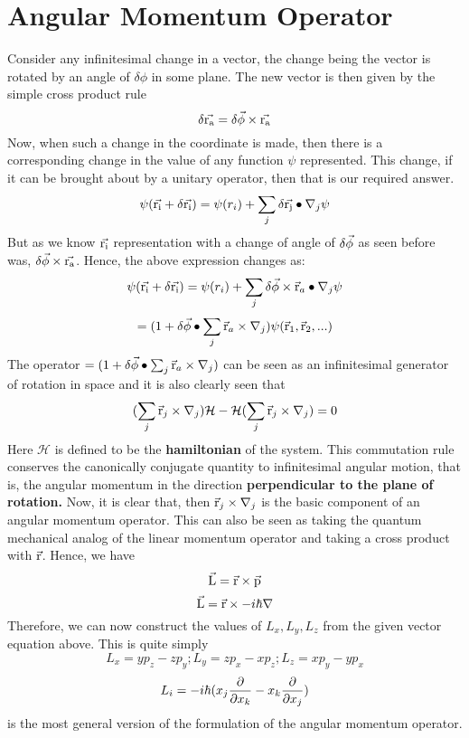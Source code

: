 \documentclass[12pt]{article}
\begin{document}
\section{Angular Momentum Operator}
Consider any infinitesimal change in a vector, the change being the vector is rotated by an angle of $\delta\phi$ in some plane. The new vector is then given by the simple cross product rule $$\delta\vec{\mathrm{r_{a}}} = {\delta\vec{\mathrm{\phi}}}\times{\ensuremath{\vec{\mathrm{r_{a}}}}}$$ Now, when such a change in the coordinate is made, then there is a corresponding change in the value of any function $\psi$ represented. This change, if it can be brought about by a unitary operator, then that is our required answer. $$\psi (\vec{\mathrm{r_{i}}}+\delta\vec{\mathrm{r_{i}}}) = \psi(r_{i}) + \sum_j \delta{\ensuremath{\vec{\mathrm{r_{j}}}}}\bullet{\ensuremath{\nabla}_{j}\psi}$$
But as we know $\vec{\mathrm{r_{i}}}$ representation with a change of angle of $\delta\vec{\mathrm{\phi}}$ as seen before was, ${\delta\vec{\mathrm{\phi}}}\times{\ensuremath{\vec{\mathrm{r_{a}}}}}$. Hence, the above expression changes as:	
$$\psi (\vec{\mathrm{r_{i}}}+\delta\vec{\mathrm{r_{i}}}) = \psi(r_{i}) + \sum_j {\delta\vec{\mathrm{\phi}}}\times{\ensuremath{{\vec{\mathrm{r}}_{a}}\bullet{\ensuremath{\nabla}_{j}\psi}}}$$
$$=(1+{\delta\vec{\mathrm{\phi}}}\bullet{\sum_j \ensuremath{{\vec{\mathrm{r}}_{a}}\times{\ensuremath{\nabla}_{j}}}})\psi(\vec{\mathrm{r}}_1,\vec{\mathrm{r}}_2,...)$$ The operator $=(1+{\delta\vec{\mathrm{\phi}}}\bullet{\sum_j \ensuremath{{\vec{\mathrm{r}}_{a}}\times{\ensuremath{\nabla}_{j}}}})$ can be seen as an infinitesimal generator of rotation in space and it is also clearly seen that $$(\sum_j{\vec{\mathrm{r}}_j}\times{\ensuremath{\nabla}_j})\mathcal{H}-\mathcal{H}(\sum_j{\vec{\mathrm{r}}_j}\times{\ensuremath{\nabla}_j}) = 0$$ Here $\mathcal{H}$ is defined to be the \textbf{hamiltonian} of the system. This commutation rule conserves the canonically conjugate quantity to infinitesimal angular motion, that is, the angular momentum in the direction \textbf{perpendicular to the plane of rotation.} Now, it is clear that, then ${\vec{\mathrm{r}}_j}\times{\ensuremath{\nabla}_j}$ is the basic component of an angular momentum operator. This can also be seen as taking the quantum mechanical analog of the linear momentum operator and taking a cross product with $\vec{\mathrm{r}}$. Hence, we have $$\vec{\mathrm{L}} = {\vec{\mathrm{r}}}\times{\ensuremath{\vec{\mathrm{p}}}}$$ $$\vec{\mathrm{L}} = {\vec{\mathrm{r}}}\times{-i\hbar\ensuremath{\nabla}}$$ Therefore, we can now construct the values of $L_x, L_y, L_z$ from the given vector equation above. This is quite simply
$$L_x = yp_z - zp_y; L_y = zp_x - xp_z; L_z = xp_y - yp_x$$
$$L_i = -i\hbar(x_j\frac{\partial{}}{\partial{x_k}} - x_k\frac{\partial{}}{\partial{x_j}})$$ is the most general version of the formulation of the angular momentum operator.
\end{document}
